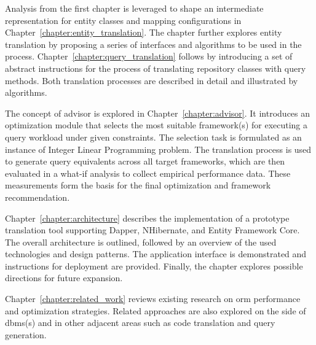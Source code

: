 Analysis from the first chapter is leveraged to shape an intermediate representation for entity classes and mapping configurations in Chapter~\ref{chapter:entity_translation}. The chapter further explores entity translation by proposing a series of interfaces and algorithms to be used in the process. Chapter~\ref{chapter:query_translation} follows by introducing a set of abstract instructions for the process of translating repository classes with query methods. Both translation processes are described in detail and illustrated by algorithms.

The concept of advisor is explored in Chapter~\ref{chapter:advisor}. It introduces an optimization module that selects the most suitable framework(s) for executing a query workload under given constraints. The selection task is formulated as an instance of Integer Linear Programming problem. The translation process is used to generate query equivalents across all target frameworks, which are then evaluated in a what-if analysis to collect empirical performance data. These measurements form the basis for the final optimization and framework recommendation.

Chapter~\ref{chapter:architecture} describes the implementation of a prototype translation tool supporting Dapper, NHibernate, and Entity Framework Core. The overall architecture is outlined, followed by an overview of the used technologies and design patterns. The application interface is demonstrated and instructions for deployment are provided. Finally, the chapter explores possible directions for future expansion.

Chapter~\ref{chapter:related_work} reviews existing research on \acrshort{orm} performance and optimization strategies. Related approaches are also explored on the side of \acrshort{dbms}(s) and in other adjacent areas such as code translation and query generation.

